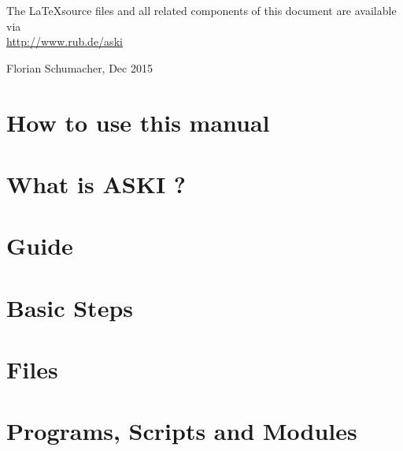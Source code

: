 \documentclass[12pt,a4paper]{book}
\newcommand{\ASKI}{ {\ttfamily ASKI} }
\begin{document}
The \LaTeX source files and all related components of this document are available via\\
\url{http://www.rub.de/aski}
\begin{flushright}
Florian Schumacher, Dec 2015
\end{flushright}
%
\chapter*{How to use this manual}

%
\chapter*{What is \ASKI?} \label{guide,sec:ASKI}

%
\tableofcontents
%
\setcounter{chapter}{-1}
\chapter{Guide} \label{guide}

%
\chapter{Basic Steps} \label{basic_steps}

%
%
\chapter{Files} %

%
\chapter{Programs, Scripts and Modules} %

%


%

%
\end{document}
